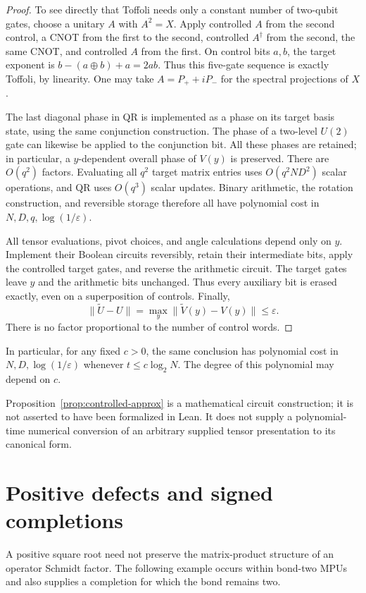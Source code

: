 \documentclass[11pt]{article}
\begin{document}
\begin{proof}
To see directly that Toffoli needs only a constant number of
two-qubit gates, choose a unitary $A$ with $A^2=X$. Apply controlled
$A$ from the second control, a CNOT from the first to the second,
controlled $A^\dagger$ from the second, the same CNOT, and controlled
$A$ from the first. On control bits $a,b$, the target exponent is
$b-(a\mathbin{\oplus}b)+a=2ab$. Thus this five-gate sequence is
exactly Toffoli, by linearity. One may take
$A=P_++iP_-$ for the spectral projections of $X$.

The last diagonal phase in QR is implemented as a phase on its
target basis state, using the same conjunction construction.
The phase of a two-level $U(2)$ gate can likewise be applied to
the conjunction bit. All these phases are retained;
in particular, a $y$-dependent overall phase of $V(y)$ is preserved.
There are $O(q^2)$ factors. Evaluating all $q^2$ target matrix
entries uses $O(q^2ND^2)$ scalar operations, and QR uses
$O(q^3)$ scalar updates. Binary arithmetic, the rotation
construction, and reversible storage therefore all have polynomial
cost in $N,D,q,\log(1/\varepsilon)$.

All tensor evaluations, pivot choices, and angle calculations depend
only on $y$. Implement their Boolean circuits reversibly, retain their
intermediate bits, apply the controlled target gates, and reverse the
arithmetic circuit. The target gates leave $y$ and the arithmetic
bits unchanged. Thus every auxiliary bit is erased exactly, even on
a superposition of controls. Finally,
\[
 \|\widetilde U-U\|
   =\max_y\|\widetilde V(y)-V(y)\|\leq\varepsilon.
\]
There is no factor proportional to the number of control words.
\end{proof}

In particular, for any fixed $c>0$, the same conclusion has
polynomial cost in $N,D,\log(1/\varepsilon)$ whenever
$t\leq c\log_2 N$. The degree of this polynomial may depend on $c$.

Proposition~\ref{prop:controlled-approx} is a mathematical circuit
construction; it is not asserted to have been formalized in Lean.
It does not supply a polynomial-time numerical conversion of an
arbitrary supplied tensor presentation to its canonical form.

\section{Positive defects and signed completions}

A positive square root need not preserve the matrix-product structure
of an operator Schmidt factor. The following example occurs within
bond-two MPUs and also supplies a completion for which the bond remains
two.
\end{document}
